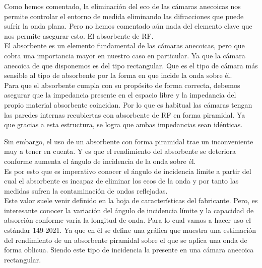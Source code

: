 \documentclass{article}
\begin{document}
Como hemos comentado, la eliminación del eco de las cámaras anecoicas nos permite controlar el entorno de medida eliminando las difracciones que puede sufrir la onda plana. Pero no hemos comentado aún nada del elemento clave que nos permite asegurar esto. El absorbente de RF. \\

El absorbente es un elemento fundamental de las cámaras anecoicas, pero que cobra una importancia mayor en nuestro caso en particular. Ya que la cámara anecoica de que disponemos es del tipo rectangular. Que es el tipo de cámara más sensible al tipo de absorbente por la forma en que incide la onda sobre él. \\

Para que el absorbente cumpla con su propósito de forma correcta, debemos asegurar que la impedancia presente en el espacio libre y la impedancia del propio material absorbente coincidan. Por lo que es habitual las cámaras tengan las paredes internas recubiertas con absorbente de RF en forma piramidal. Ya que gracias a esta estructura, se logra que ambas impedancias sean idénticas. 

Sin embargo, el uso de un absorbente con forma piramidal trae un inconveniente muy a tener en cuenta. Y es que el rendimiento del absorbente se deteriora conforme aumenta el ángulo de incidencia de la onda sobre él.\\
Es por esto que es imperativo conocer el ángulo de incidencia límite a partir del cual el absorbente es incapaz de eliminar los ecos de la onda y por tanto las medidas sufren la contaminación de ondas reflejadas.\\

Este valor suele venir definido en la hoja de características del fabricante. Pero, es interesante conocer la variación del ángulo de incidencia límite y la capacidad de absorción conforme varía la longitud de onda. Para lo cual vamos a hacer uso el estándar 149-2021. Ya que en él se define una gráfica que muestra una estimación del rendimiento de un absorbente piramidal sobre el que se aplica una onda de forma oblicua. Siendo este tipo de incidencia la presente en una cámara anecoica rectangular. 
\end{document}
